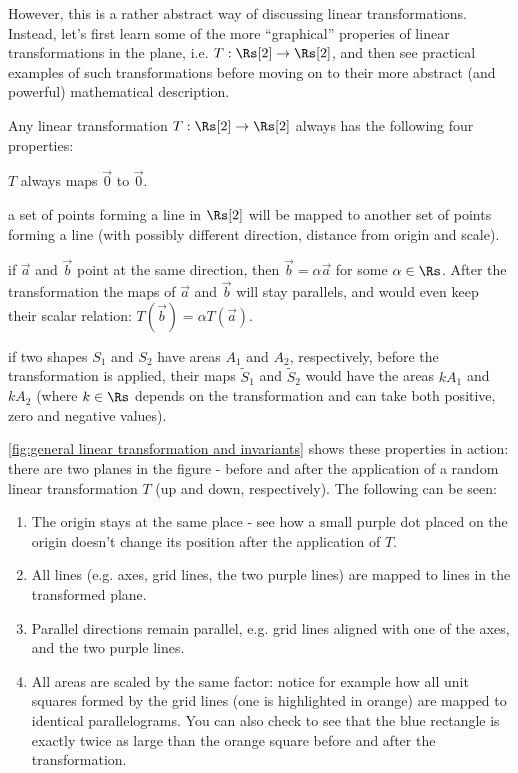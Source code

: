 However, this is a rather abstract way of discussing linear transformations. Instead, let's first learn some of the more \enquote{graphical} properies of linear transformations in the plane, i.e. $T:\Rs[2]\to\Rs[2]$, and then see practical examples of such transformations before moving on to their more abstract (and powerful) mathematical description.

Any linear transformation $T:\Rs[2]\to\Rs[2]$ always has the following four properties:
\begin{descitemize}
	\item[The origin is kept untouched] $T$ always maps $\vec{0}$ to $\vec{0}$.
	\item[Lines remain lines] a set of points forming a line in $\Rs[2]$ will be mapped to another set of points forming a line (with possibly different direction, distance from origin and scale).
	\item[Parallel directions remain parallel] if $\vec{a}$ and $\vec{b}$ point at the same direction, then $\vec{b}=\alpha\vec{a}$ for some $\alpha\in\Rs$. After the transformation the maps of $\vec{a}$ and $\vec{b}$ will stay parallels, and would even keep their scalar relation: $T(\vec{b})=\alpha T(\vec{a})$.
	\item[All areas are scaled by the same factor] if two shapes $S_{1}$ and $S_{2}$ have areas $A_{1}$ and $A_{2}$, respectively, before the transformation is applied, their maps $\tilde{S}_{1}$ and $\tilde{S}_{2}$ would have the areas $kA_{1}$ and $kA_{2}$ (where $k\in\Rs$ depends on the transformation and can take both positive, zero and negative values).
\end{descitemize}
\autoref{fig:general linear transformation and invariants} shows these properties in action: there are two planes in the figure - before and after the application of a random linear transformation $T$ (up and down, respectively). The following can be seen:
\begin{enumerate}
	\item The origin stays at the same place - see how a small purple dot placed on the origin doesn't change its position after the application of $T$.
	\item All lines (e.g. axes, grid lines, the two purple lines) are mapped to lines in the transformed plane.
	\item Parallel directions remain parallel, e.g. grid lines aligned with one of the axes, and the two purple lines.
	\item All areas are scaled by the same factor: notice for example how all unit squares formed by the grid lines (one is highlighted in orange) are mapped to identical parallelograms. You can also check to see that the blue rectangle is exactly twice as large than the orange square before and after the transformation.
\end{enumerate}

